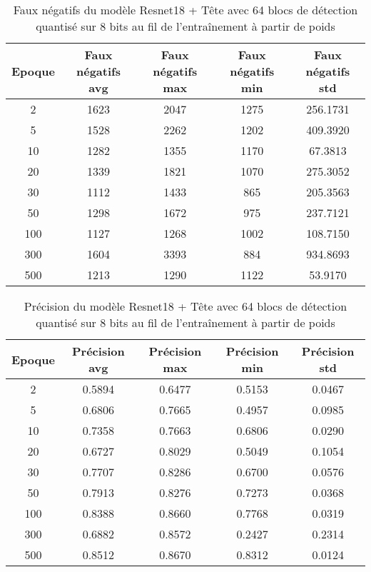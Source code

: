 \begin{table}[!ht]
    \caption{Faux négatifs du modèle Resnet18 + Tête avec 64 blocs de détection quantisé sur 8 bits au fil de l'entraînement à partir de poids}
    \label{tab:qresnet18+head_64n_false_negative_8b_from_weights}
    \centering
    \begin{tabular}{ |c||c|c|c|c|  }
        \hline
        \rowcolor{gray!50}
        Epoque & Faux négatifs avg & Faux négatifs max & Faux négatifs min & Faux négatifs std\\
        \hline
        2 & 1623 & 2047 & 1275 & 256.1731\\
        5 & 1528 & 2262 & 1202 & 409.3920\\
        10 & 1282 & 1355 & 1170 & 67.3813\\
        20 & 1339 & 1821 & 1070 & 275.3052\\
        30 & 1112 & 1433 & 865 & 205.3563\\
        50 & 1298 & 1672 & 975 & 237.7121\\
        100 & 1127 & 1268 & 1002 & 108.7150\\
        300 & 1604 & 3393 & 884 & 934.8693\\
        500 & 1213 & 1290 & 1122 & 53.9170\\
        \hline
    \end{tabular}
\end{table}

\begin{table}[!ht]
    \caption{Précision du modèle Resnet18 + Tête avec 64 blocs de détection quantisé sur 8 bits au fil de l'entraînement à partir de poids}
    \label{tab:qresnet18+head_64n_precision_8b_from_weights}
    \centering
    \begin{tabular}{ |c||c|c|c|c|  }
        \hline
        \rowcolor{gray!50}
        Epoque & Précision avg & Précision max & Précision min & Précision std\\
        \hline
        2 & 0.5894 & 0.6477 & 0.5153 & 0.0467\\
        5 & 0.6806 & 0.7665 & 0.4957 & 0.0985\\
        10 & 0.7358 & 0.7663 & 0.6806 & 0.0290\\
        20 & 0.6727 & 0.8029 & 0.5049 & 0.1054\\
        30 & 0.7707 & 0.8286 & 0.6700 & 0.0576\\
        50 & 0.7913 & 0.8276 & 0.7273 & 0.0368\\
        100 & 0.8388 & 0.8660 & 0.7768 & 0.0319\\
        300 & 0.6882 & 0.8572 & 0.2427 & 0.2314\\
        500 & 0.8512 & 0.8670 & 0.8312 & 0.0124\\
        \hline
    \end{tabular}
\end{table}

